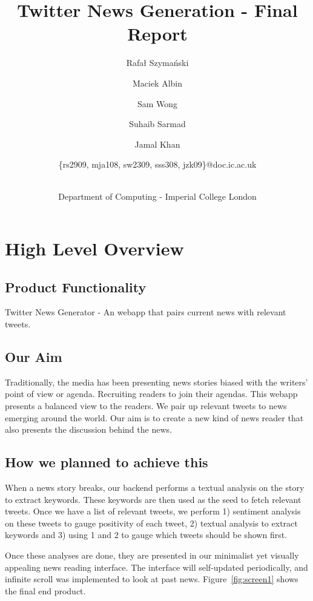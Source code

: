 \documentclass{report}
\title{Twitter News Generation - Final Report}
\author{
    \small{Rafał Szymański}\\
  	\and
    \small{Maciek Albin}\\
    \and
    \small{Sam Wong}\\
    \and  
    \small{Suhaib Sarmad}\\
		\and
		\small{Jamal Khan}\\
		\and
		\small{\{rs2909, mja108, sw2309, sss308, jzk09\}@doc.ic.ac.uk}
		\and
		\\Department of Computing - Imperial College London
}
\begin{document}
 
	\maketitle
	\tableofcontents
	\newpage

	\chapter{High Level Overview}
	
	\section{Product Functionality}
	
	Twitter News Generator - An webapp that pairs current news with relevant tweets.

	\section{Our Aim}

	Traditionally, the media has been presenting news stories biased with the writers’ point of view or agenda. Recruiting readers to join their agendas. This webapp presents a balanced view to the readers. We pair up relevant tweets to news emerging around the world. Our aim is to create a new kind of news reader that also presents the discussion behind the news. 
	
	\section{How we planned to achieve this}

	When a news story breaks, our backend performs a textual analysis on the story to extract keywords. These keywords are then used as the seed to fetch relevant tweets. Once we have a list of relevant tweets, we perform 1) sentiment analysis on these tweets to gauge positivity of each tweet, 2) textual analysis to extract keywords and 3) using 1 and 2 to gauge which tweets should be shown first.

	Once these analyses are done, they are presented in our minimalist yet visually appealing news reading interface. The interface will self-updated periodically, and infinite scroll was implemented to look at past news. Figure~\ref{fig:screen1} shows the final end product.
\end{document}
